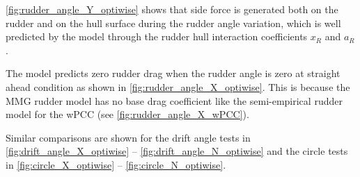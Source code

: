 \autoref{fig:rudder_angle_Y_optiwise} shows that side force is generated both on the rudder and on the hull surface during the rudder angle variation, which is well predicted by the model through the rudder hull interaction coefficients $x_R$ and $a_R$. 

The model predicts zero rudder drag when the rudder angle is zero at straight ahead condition as shown in \autoref{fig:rudder_angle_X_optiwise}. This is because the MMG rudder model has no base drag coefficient like the semi-empirical rudder model for the wPCC (see \autoref{fig:rudder_angle_X_wPCC}).

Similar comparisons are shown for the drift angle tests in \autoref{fig:drift_angle_X_optiwise} -- \autoref{fig:drift_angle_N_optiwise} and the circle tests in \autoref{fig:circle_X_optiwise} -- \autoref{fig:circle_N_optiwise}. 
